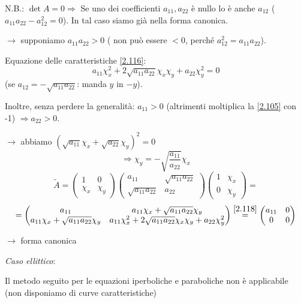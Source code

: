 \documentclass[a4paper,11pt]{report}
\begin{document}
N.B.: $\det A=0 \Rightarrow$ Se uno dei coefficienti $a_{11}, a_{22}$ \`e nullo lo \`e anche $a_{12}$ ($a_{11}a_{22}-a_{12}^2=0$). In tal caso siamo già nella forma canonica.

$\rightarrow $ supponiamo $a_{11}a_{22}>0$ ( non pu\`o essere $<0$, perch\'e $a_{12}^2 = a_{11}a_{22}$).

Equazione delle caratteristiche \eqref{2.116}:
\[
a_{11}\chi_x^2+2\sqrt{a_{11}a_{22}}\chi_x\chi_y + a_{22}\chi_y^2 =0
\]
(se $a_{12}=-\sqrt{a_{11}a_{22}}$: manda $y$ in $-y$).

Inoltre, senza perdere la generalit\`a: $a_{11}>0$ (altrimenti moltiplica la \eqref{2.105} con -1) $\Rightarrow a_{22}>0$.

$\rightarrow$ abbiamo $(\sqrt{a_{11}}\chi_x + \sqrt{a_{22}}\chi_y)^2=0$
\begin{equation}
\Rightarrow\chi_y = - \sqrt{\frac{a_{11}}{a_{22}}}\chi_x
\label{2.118}
\end{equation}
\[
\tilde{A}=\left(\begin{matrix}
1 & 0\\
\chi_x & \chi_y
\end{matrix}\right)\left(\begin{matrix}
a_{11} & \sqrt{a_{11}a_{22}}\\
\sqrt{a_{11}a_{22}} & a_{22}
\end{matrix}\right)\left(\begin{matrix}
1 & \chi_x \\
0 & \chi_y
\end{matrix}\right)=
\]
\[
=\left(\begin{matrix}
a_{11} & a_{11}\chi_x + \sqrt{a_{11}a_{22}}\chi_y \\
a_{11}\chi_x + \sqrt{a_{11}a_{22}}\chi_y & a_{11}\chi_x^2 + 2\sqrt{a_{11}a_{22}}\chi_x\chi_y + a_{22}\chi_y^2
\end{matrix}\right)\overset{\eqref{2.118}}{=}\left(\begin{matrix}
a_{11} & 0\\
0 & 0
\end{matrix}\right)
\]

$\rightarrow$ forma canonica

\medskip

\emph{Caso ellittico}:

Il metodo seguito per le equazioni iperboliche e paraboliche non \`e applicabile (non disponiamo di curve caratteristiche)
\end{document}
